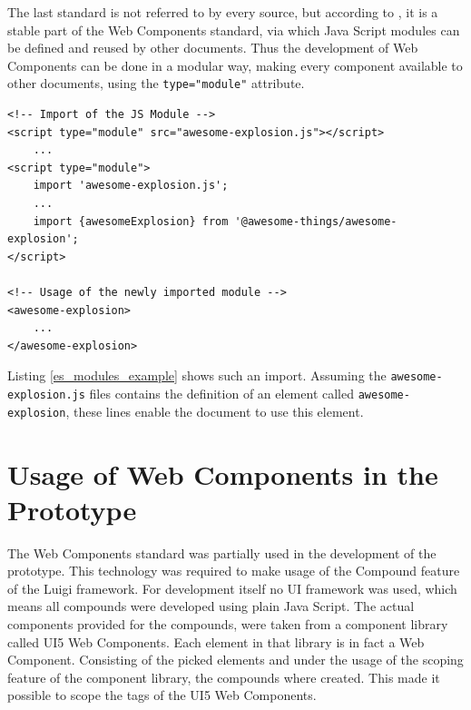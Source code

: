 The last standard is not referred to by every source, but according to \cite{wc_specifications}, it is a stable part of the Web Components standard, via which Java Script modules can be defined and reused by other documents.
Thus the development of Web Components can be done in a modular way, making every component available to other documents, using the \texttt{type="module"} attribute.

\begin{lstlisting}[language=HTML5, caption=Importing modular Java Script documents into another \cite{wc_specifications}, label=es_modules_example]
<!-- Import of the JS Module -->
<script type="module" src="awesome-explosion.js"></script>
	...
<script type="module">
	import 'awesome-explosion.js';
	...
	import {awesomeExplosion} from '@awesome-things/awesome-explosion';
</script>

<!-- Usage of the newly imported module -->
<awesome-explosion>
	...
</awesome-explosion>
\end{lstlisting}

Listing \ref{es_modules_example} shows such an import. Assuming the \texttt{awesome-explosion.js} files contains the definition of an element called \texttt{awesome-explosion}, these lines enable the document to use this element.\cite{wc_specifications}

\section{Usage of Web Components in the Prototype}

The Web Components standard was partially used in the development of the prototype. This technology was required to make usage of the Compound feature of the Luigi framework. \cite{luigi_wc} \cite{luigi_compound}
For development itself no UI framework was used, which means all compounds were developed using plain Java Script. The actual components provided for the compounds, were taken from a component library called UI5 Web Components. Each element in that library is in fact a Web Component.\cite{ui5_wc_github}
Consisting of the picked elements and under the usage of the scoping feature of the component library, the compounds where created. This made it possible to scope the tags of the UI5 Web Components.\cite{ui5_webcomponents_scoping}


